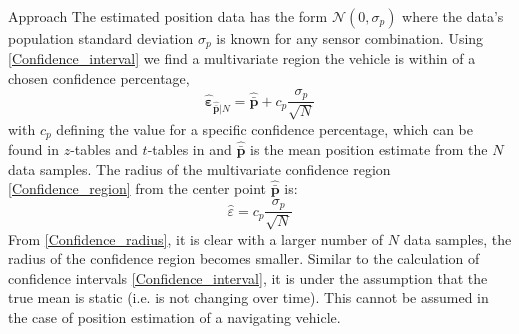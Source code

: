 \begin{section}{Approach}
The estimated position data has the form $\mathcal{N}(0,\sigma_p)$ where the data's population standard deviation $\sigma_p$ is known for any sensor combination. Using \eqref{Confidence_interval} we find a multivariate region the vehicle is within of a chosen confidence percentage,
    \begin{equation}
    \label{Confidence_region}
		\hat{\bm{\varepsilon}}_{\hat{\bar{\bm{p}}}|N} = \hat{\bar{\bm{p}}} + c_p\frac{\sigma_p}{\sqrt{N}}
	\end{equation}
with $c_p$ defining the value for a specific confidence percentage, which can be found in $z$-tables and $t$-tables in \cite{devore2011probability} and $\hat{\bar{\bm{p}}}$ is the mean position estimate from the $N$ data samples. The radius of the multivariate confidence region \eqref{Confidence_region} from the center point $\hat{\bar{\bm{p}}}$ is:
    \begin{equation}
    \label{Confidence_radius}
		\hat{\varepsilon} = c_p\frac{\sigma_p}{\sqrt{N}}
	\end{equation}
From \eqref{Confidence_radius}, it is clear with a larger number of $N$ data samples, the radius of the confidence region becomes smaller. Similar to the calculation of confidence intervals \eqref{Confidence_interval}, it is under the assumption that the true mean is static (i.e. is not changing over time). This cannot be assumed in the case of position estimation of a navigating vehicle. 




\end{section}
